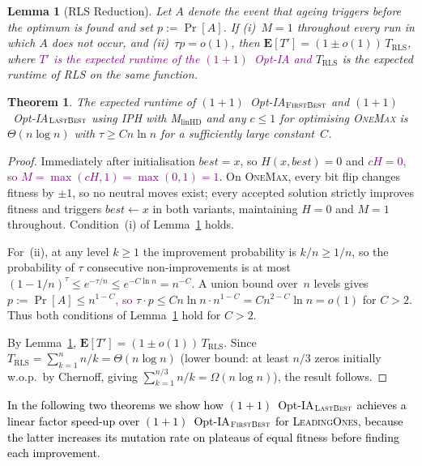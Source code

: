 \documentclass[lettersize,journal]{IEEEtran}
\newcommand{\new}[1]{\textcolor{black}{#1}}
\newcommand{\rerev}[1]{\textcolor{purple}{#1}}
\newcommand{\oneoneOPTIA}{$(1+1)$~Opt-IA}
\newcommand{\linHD}{M$_{\text{linHD}}$}
\newcommand{\IPHfcm}{IPH}
\newcommand{\firstBest}{$(1+1)$~Opt-IA$_{\textsc{FirstBest}}$}
\newcommand{\lastBest}{$(1+1)$~Opt-IA$_{\textsc{LastBest}}$}
\newtheorem{theorem}{Theorem}
\newtheorem{lemma}{Lemma}
\begin{document}
\begin{lemma}[RLS Reduction]\label{lem:RLS-reduction}
Let $A$ denote the event that ageing triggers before the optimum is found
and set $p:=\Pr[A]$.
If \emph{(i)}~$M=1$ throughout every run in which $A$ does not occur, and
\emph{(ii)}~$\tau p=o(1)$,
then $\mathbf{E}[T']=(1\pm o(1))\,T_{\mathrm{RLS}}$,
where \rerev{$T'$ is the expected runtime of the \oneoneOPTIA{} and} $T_{\mathrm{RLS}}$ is the expected runtime of RLS
 on the same function.
\end{lemma}



\begin{theorem}\label{thm:onemaxexpo}
The expected runtime of \firstBest{} and \lastBest{} using \IPHfcm{} with
\linHD{} and any $c\leq 1$ for optimising \textsc{OneMax} is $\Theta(n\log n)$
with $\tau\geq Cn\ln n$ for a sufficiently large constant~$C$.
\end{theorem}
\begin{proof}
Immediately after initialisation $\mathit{best}=x$, so $H(x,\mathit{best})=0$
and \rerev{$cH=0$, so $M=\max(cH,1)=\max(0,1)=1$}.
On \textsc{OneMax}, every bit flip changes fitness by $\pm 1$, so no neutral
moves exist; every accepted solution strictly improves fitness and triggers
$\mathit{best}\leftarrow x$ in both variants, maintaining $H=0$ and $M=1$
throughout.  Condition~(i) of Lemma~\ref{lem:RLS-reduction} holds.

For~(ii), at any level $k\geq 1$ the improvement probability is $k/n\geq 1/n$,
so the probability of $\tau$ consecutive non-improvements is at most
$(1-1/n)^\tau\leq e^{-\tau/n}\leq e^{-C\ln n}=n^{-C}$.
A union bound over~$n$ levels gives $p:=\Pr[A]\leq n^{1-C}$\rerev{, so}
$\tau\cdot p\leq Cn\ln n\cdot n^{1-C}=Cn^{2-C}\ln n=o(1)$ for $C>2$.
Thus both conditions of Lemma~\ref{lem:RLS-reduction} hold for $C>2$.

By Lemma~\ref{lem:RLS-reduction},
$\mathbf{E}[T']=(1\pm o(1))\,T_{\mathrm{RLS}}$.
Since $T_{\mathrm{RLS}}=\sum_{k=1}^{n}n/k=\Theta(n\log n)$ (lower bound: at
least $n/3$ zeros initially w.o.p.\ by Chernoff, giving
$\sum_{k=1}^{n/3}n/k=\Omega(n\log n)$), the result follows.
\end{proof}



\new{In the following two theorems we show how \lastBest{} achieves a linear
factor speed-up over \firstBest{} for \textsc{LeadingOnes}, because the latter
increases its mutation rate on plateaus of equal fitness before finding each
improvement.}
\end{document}
